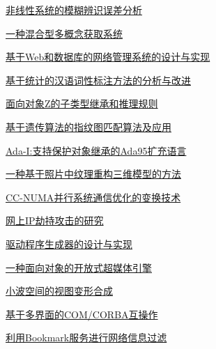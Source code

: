 \documentclass[a4paper]{article}
\begin{document}
\href{http://www.jos.org.cn/ch/reader/download_pdf.aspx?file_no=20000404&year_id=2000&quarter_id=4&falg=1}{非线性系统的模糊辨识误差分析}

\href{http://www.jos.org.cn/ch/reader/download_pdf.aspx?file_no=20000405&year_id=2000&quarter_id=4&falg=1}{一种混合型多概念获取系统}

\href{http://www.jos.org.cn/ch/reader/download_pdf.aspx?file_no=20000407&year_id=2000&quarter_id=4&falg=1}{基于Web和数据库的网络管理系统的设计与实现}

\href{http://www.jos.org.cn/ch/reader/download_pdf.aspx?file_no=20000408&year_id=2000&quarter_id=4&falg=1}{基于统计的汉语词性标注方法的分析与改进}

\href{http://www.jos.org.cn/ch/reader/download_pdf.aspx?file_no=20000409&year_id=2000&quarter_id=4&falg=1}{面向对象Z的子类型继承和推理规则}

\href{http://www.jos.org.cn/ch/reader/download_pdf.aspx?file_no=20000410&year_id=2000&quarter_id=4&falg=1}{基于遗传算法的指纹图匹配算法及应用}

\href{http://www.jos.org.cn/ch/reader/download_pdf.aspx?file_no=20000411&year_id=2000&quarter_id=4&falg=1}{Ada-I:支持保护对象继承的Ada95扩充语言}

\href{http://www.jos.org.cn/ch/reader/download_pdf.aspx?file_no=20000412&year_id=2000&quarter_id=4&falg=1}{一种基于照片中纹理重构三维模型的方法}

\href{http://www.jos.org.cn/ch/reader/download_pdf.aspx?file_no=20000413&year_id=2000&quarter_id=4&falg=1}{CC-NUMA并行系统通信优化的变换技术}

\href{http://www.jos.org.cn/ch/reader/download_pdf.aspx?file_no=20000414&year_id=2000&quarter_id=4&falg=1}{网上IP劫持攻击的研究}

\href{http://www.jos.org.cn/ch/reader/download_pdf.aspx?file_no=20000415&year_id=2000&quarter_id=4&falg=1}{驱动程序生成器的设计与实现}

\href{http://www.jos.org.cn/ch/reader/download_pdf.aspx?file_no=20000416&year_id=2000&quarter_id=4&falg=1}{一种面向对象的开放式超媒体引擎}

\href{http://www.jos.org.cn/ch/reader/download_pdf.aspx?file_no=20000417&year_id=2000&quarter_id=4&falg=1}{小波空间的视图变形合成}

\href{http://www.jos.org.cn/ch/reader/download_pdf.aspx?file_no=20000418&year_id=2000&quarter_id=4&falg=1}{基于多界面的COM/CORBA互操作}

\href{http://www.jos.org.cn/ch/reader/download_pdf.aspx?file_no=20000419&year_id=2000&quarter_id=4&falg=1}{利用Bookmark服务进行网络信息过滤}
\end{document}
